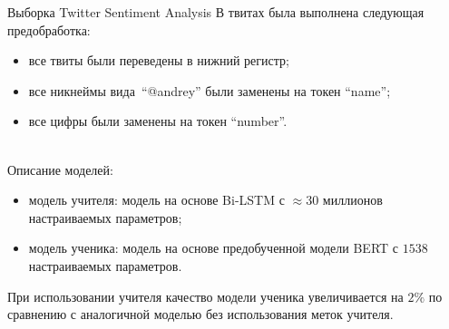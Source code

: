 \documentclass[10pt,pdf,hyperref={unicode}]{beamer}
\begin{document}
\begin{frame}{Выборка Twitter Sentiment Analysis}
\justifying
В твитах была выполнена следующая предобработка:
\begin{itemize}
	\item все твиты были переведены в нижний регистр;
	\item все никнеймы вида~``@andrey'' были заменены на токен ``name'';
	\item все цифры были заменены на токен ``number''.
\end{itemize}

~\\
Описание моделей:
\begin{itemize}
	\item модель учителя: модель на основе Bi-LSTM с $\approx 30$ миллионов настраиваемых параметров;
	\item модель ученика: модель на основе предобученной модели BERT с $1538$ настраиваемых параметров.
\end{itemize}

\begin{table}[]
\begin{center}
\end{center}
\end{table}
При использовании учителя качество модели ученика увеличивается на $2\%$ по сравнению с аналогичной моделью без использования меток учителя.
\end{frame}
\end{document}
